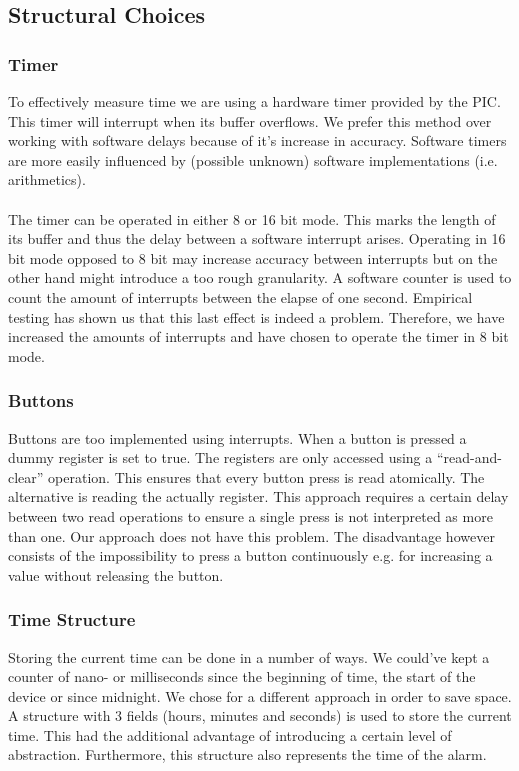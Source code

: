 \documentclass[11pt]{article}
\begin{document}
\subsection{Structural Choices}
\subsubsection{Timer}
To effectively measure time we are using a hardware timer provided by the PIC. This timer will interrupt when its buffer overflows. We prefer this method over working with software delays because of it's increase in accuracy. Software timers are more easily influenced by (possible unknown) software implementations (i.e. arithmetics).
\\\\
The timer can be operated in either 8 or 16 bit mode. This marks the length of its buffer and thus the delay between a software interrupt arises. Operating in 16 bit mode opposed to 8 bit may increase accuracy between interrupts but on the other hand might introduce a too rough granularity. A software counter is used to count the amount of interrupts between the elapse of one second. Empirical testing has shown us that this last effect is indeed a problem. Therefore, we have increased the amounts of interrupts and have chosen to operate the timer in 8 bit mode.

\subsubsection{Buttons}
Buttons are too implemented using interrupts. When a button is pressed a dummy register is set to true. The registers are only accessed using a ``read-and-clear'' operation. This ensures that every button press is read atomically. The alternative is reading the actually register. This approach requires a certain delay between two read operations to ensure a single press is not interpreted as more than one. Our approach does not have this problem. The disadvantage however consists of the impossibility to press a button continuously e.g. for increasing a value without releasing the button.

\subsubsection{Time Structure}
Storing the current time can be done in a number of ways. We could've kept a counter of nano- or milliseconds since the beginning of time, the start of the device or since midnight. We chose for a different approach in order to save space. A structure with 3 fields (hours, minutes and seconds) is used to store the current time. This had the additional advantage of introducing a certain level of abstraction. Furthermore, this structure also represents the time of the alarm.  
\end{document}
